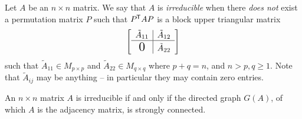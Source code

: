 \begin{defn}
    Let $A$ be an $n \times n$ matrix. We say that $A$ is \emph{irreducible} when there \emph{does not} exist a permutation matrix $P$ such that ${P}^{\mkern-1.5mu\mathsf{T}}AP$ is a block upper triangular matrix
    \begin{align*}
        \left[\begin{array}{c|c}
            \tilde{A}_{11} & \tilde{A}_{12} \\
            \hline
            \raisebox{0pt}[12pt][0pt]{\scalebox{1.5}{$0$}} & \tilde{A}_{22}
        \end{array}\right]
    \end{align*}
    such that $\tilde{A}_{11} \in M_{p\times p}$ and $\tilde{A}_{22} \in M_{q \times q}$ where $p + q = n$, and $n > p, q \geq 1$. Note that $\tilde{A}_{ij}$ may be anything -- in particular they may contain zero entries.
\end{defn}

\begin{prop}
    An $n \times n$ matrix $A$ is irreducible if and only if the directed graph $G(A)$, of which $A$ is the adjacency matrix, is strongly connected.
\end{prop}

